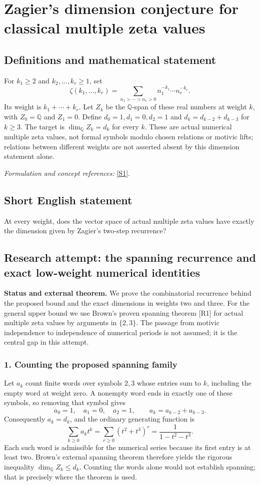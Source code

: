 \documentclass[11pt]{article}
\begin{document}
\section*{\texorpdfstring{Zagier's dimension conjecture for classical multiple zeta values}{Zagier's dimension conjecture for classical multiple zeta values}}\label{30006982}
\subsection{Definitions and mathematical statement}
For $k_1\ge2$ and $k_2,\ldots,k_r\ge1$, set
\[
 \zeta(k_1,\ldots,k_r)=\sum_{n_1>\cdots>n_r>0}
 n_1^{-k_1}\cdots n_r^{-k_r}.
\]
Its weight is $k_1+\cdots+k_r$. Let $Z_k$ be the ${\mathbb{Q}}$-span of these real numbers at weight $k$, with $Z_0={\mathbb{Q}}$ and $Z_1=0$. Define $d_0=1,d_1=0,d_2=1$ and
$d_k=d_{k-2}+d_{k-3}$ for $k\ge3$. The target is $\dim_{{\mathbb{Q}}}Z_k=d_k$ for every $k$. These are actual numerical multiple zeta values, not formal symbols modulo chosen relations or motivic lifts; relations between different weights are not asserted absent by this dimension statement alone.
\par\smallskip\textit{Formulation and concept references:} \href{https://www2.math.kyushu-u.ac.jp/~mkaneko/papers/40conjecture_dimension.pdf}{[S1]}.

\subsection{Short English statement}
At every weight, does the vector space of actual multiple zeta values have exactly the dimension given by Zagier's two-step recurrence?
\subsection{Research attempt: the spanning recurrence and exact low-weight numerical identities}
\textbf{Status and external theorem.} We prove the combinatorial recurrence behind the proposed bound and the exact dimensions in weights two and three. For the general upper bound we use Brown's proven spanning theorem [R1] for actual multiple zeta values by arguments in $\{2,3\}$. The passage from motivic independence to independence of numerical periods is not assumed; it is the central gap in this attempt.

\subsubsection{1. Counting the proposed spanning family}
Let $a_k$ count finite words over symbols $2,3$ whose entries sum to $k$, including the empty word at weight zero. A nonempty word ends in exactly one of these symbols, so removing that symbol gives
\[a_0=1,\quad a_1=0,\quad a_2=1,\qquad a_k=a_{k-2}+a_{k-3}.\]
Consequently $a_k=d_k$, and the ordinary generating function is
\[\sum_{k\ge0}a_kt^k=\sum_{r\ge0}(t^2+t^3)^r=\frac1{1-t^2-t^3}.\]
Each such word is admissible for the numerical series because its first entry is at least two. Brown's external spanning theorem therefore yields the rigorous inequality $\dim_{\mathbb Q}Z_k\le d_k$. Counting the words alone would not establish spanning; that is precisely where the theorem is used.
\end{document}
